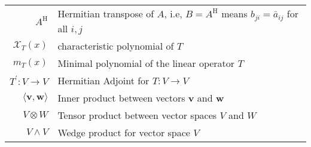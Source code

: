 \begin{tabular}{rl}
 \(A^{\mathrm{H}}\) & Hermitian transpose of \(A\), i.e, \(B = A^{\mathrm{H}}\) means \({b}_{ji} = {\bar{a}}_{ij}\) for all \(i,j\)\\

 \({\mathcal{X}}_{T}\left( x\right) \) & characteristic polynomial of \(T\)\\

 \({m}_{T}\left( x\right) \) & Minimal polynomial of the linear operator \(T\)\\

 \({T}^{\prime } : V \rightarrow  V\) & Hermitian Adjoint for \(T : V \rightarrow  V\)\\

 \(\langle \mathbf{v},\mathbf{w}\rangle \) & Inner product between vectors \(\mathbf{v}\) and \(\mathbf{w}\)\\

 \(V \otimes  W\) & Tensor product between vector spaces \(V\) and \(W\)\\

 \(V \land  V\) & Wedge product for vector space \(V\)
\end{tabular}